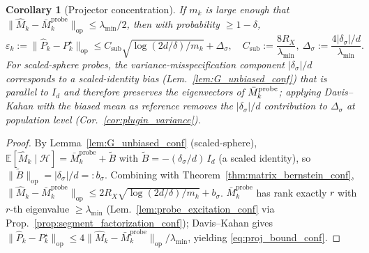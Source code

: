 \documentclass{article}
\newcommand{\E}{\mathbb{E}}
\newcommand{\op}{\mathrm{op}}
\newcommand{\cH}{\mathcal{H}}
\newtheorem{corollary}[theorem]{Corollary}
\begin{document}
\begin{corollary}[Projector concentration]
\label{cor:projector_conf}
If $m_k$ is large enough that
$\|\widehat M_k - \bar M_k^{\mathrm{probe}}\|_\op \le \lambda_{\min}/2$,
then with probability $\ge 1-\delta$,
\begin{equation}
\varepsilon_k := \|\widehat P_k - P_k^\star\|_\op
\le C_{\mathrm{sub}}\sqrt{\log(2d/\delta)/m_k}
+ \Delta_\sigma,\quad
C_{\mathrm{sub}} := \frac{8 R_X}{\lambda_{\min}},\
\Delta_\sigma := \frac{4|\delta_\sigma|/d}{\lambda_{\min}}.
\label{eq:proj_bound_conf}
\end{equation}
For scaled-sphere probes, the variance-misspecification component
$|\delta_\sigma|/d$ corresponds to a scaled-identity bias
(Lem.~\ref{lem:G_unbiased_conf}) that is parallel to $I_d$ and
therefore preserves the eigenvectors of $\bar M_k^{\rm probe}$;
applying Davis--Kahan with the biased mean as reference removes the
$|\delta_\sigma|/d$ contribution to $\Delta_\sigma$ at population
level (Cor.~\ref{cor:plugin_variance}).
\end{corollary}
\begin{proof}
By Lemma~\ref{lem:G_unbiased_conf} (scaled-sphere),
$\E[\widehat M_k\mid\cH] = \bar M_k^{\mathrm{probe}} + \widetilde B$
with $\widetilde B = -(\delta_\sigma/d)\,I_d$ (a scaled identity), so
$\|\widetilde B\|_\op = |\delta_\sigma|/d =: b_\sigma$. Combining with
Theorem~\ref{thm:matrix_bernstein_conf},
$\|\widehat M_k - \bar M_k^{\mathrm{probe}}\|_\op
\le 2R_X\sqrt{\log(2d/\delta)/m_k} + b_\sigma$.
$\bar M_k^{\mathrm{probe}}$ has rank exactly $r$ with $r$-th
eigenvalue $\ge\lambda_{\min}$ (Lem.~\ref{lem:probe_excitation_conf}
via Prop.~\ref{prop:segment_factorization_conf}); Davis--Kahan
\citep[Thm.~VII.3.1]{bhatia2013matrix} gives
$\|\widehat P_k - P_k^\star\|_\op\le 4\|\widehat M_k - \bar M_k^{\mathrm{probe}}\|_\op / \lambda_{\min}$,
yielding \eqref{eq:proj_bound_conf}.
\end{proof}
\end{document}
